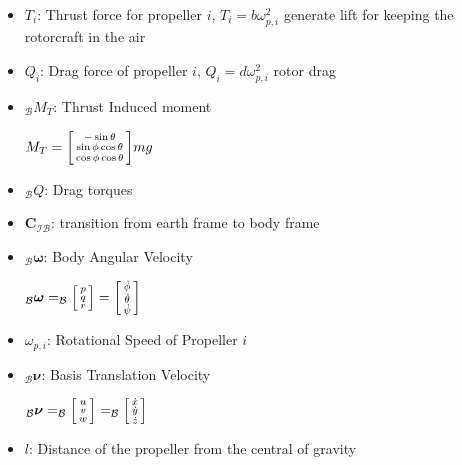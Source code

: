\documentclass[landscape,a0paper,fontscale=0.285]{baposter} %
\newcommand{\compresslist}{ %
\setlength{\itemsep}{1pt}
\setlength{\parskip}{0pt}
\setlength{\parsep}{0pt}
}
\renewenvironment{bmatrix}{\left[\begin{smallmatrix}}{\end{smallmatrix}\right]}
\begin{document}
\begin{poster}
{\begin{itemize}\compresslist
    \item $T_i$: Thrust force for propeller $i$, $T_i = b\omega_{p,i}^2$ generate lift for keeping the rotorcraft in the air
    \item $Q_i$: Drag force of propeller $i$, $Q_i = d\omega_{p,i}^2$ rotor drag
    \item $_{\mathcal{B}}M_T$: Thrust Induced moment 
    
    $M_T = \begin{bmatrix}-\sin\theta\\\sin\phi\cos\theta\\\cos\phi \cos\theta\end{bmatrix}mg$
    
    
\end{itemize}


\begin{itemize}\compresslist
     \item $_{\mathcal{B}}Q$: Drag torques
    \item $\mathbf{C}_{\mathcal{IB}}$: transition from earth frame to body frame
    \item $_{\mathcal{B}}\boldsymbol{\omega}$: Body Angular Velocity 
    
    $_{\mathcal{B}}\boldsymbol{\omega} =_{\mathcal{B}} \begin{bmatrix}p\\q\\r\end{bmatrix} = \begin{bmatrix}\dot{\phi}\\\dot{\theta}\\\dot{\psi}\end{bmatrix}$
    \item $\omega_{p,i}$: Rotational Speed of Propeller $i$
    \item $_{\mathcal{B}}\boldsymbol{\nu}$: Basis Translation Velocity 
    
    $_{\mathcal{B}}\boldsymbol{\nu} = _{\mathcal{B}}\begin{bmatrix}u\\v\\w\end{bmatrix} = _{\mathcal{B}}\begin{bmatrix}\dot{x}\\\dot{y}\\\dot{z}\end{bmatrix}$
    \item $l$: Distance of the propeller from the central of gravity
\end{itemize}

}
\end{poster}
\end{document}
